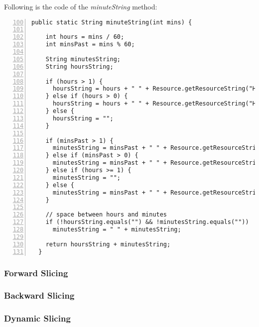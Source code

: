 \documentclass[fontsize=12pt,paper=letter,twoside]{scrartcl}
\begin{document}
\noindent Following is the code of the \emph{minuteString} method:
\begin{lstlisting}[numbers=left,firstnumber=100]
  public static String minuteString(int mins) {
    
    int hours = mins / 60;
    int minsPast = mins % 60;
    
    String minutesString;
    String hoursString;
    
    if (hours > 1) {
      hoursString = hours + " " + Resource.getResourceString("Hours");
    } else if (hours > 0) {
      hoursString = hours + " " + Resource.getResourceString("Hour");
    } else {
      hoursString = "";
    }

    if (minsPast > 1) {
      minutesString = minsPast + " " + Resource.getResourceString("Minutes");
    } else if (minsPast > 0) {
      minutesString = minsPast + " " + Resource.getResourceString("Minute");
    } else if (hours >= 1) {
      minutesString = "";
    } else {
      minutesString = minsPast + " " + Resource.getResourceString("Minutes");
    }

    // space between hours and minutes
    if (!hoursString.equals("") && !minutesString.equals(""))
      minutesString = " " + minutesString;

    return hoursString + minutesString;
  }
\end{lstlisting}

\subsubsection{Forward Slicing}


\subsubsection{Backward Slicing}


\subsubsection{Dynamic Slicing}
\end{document}
